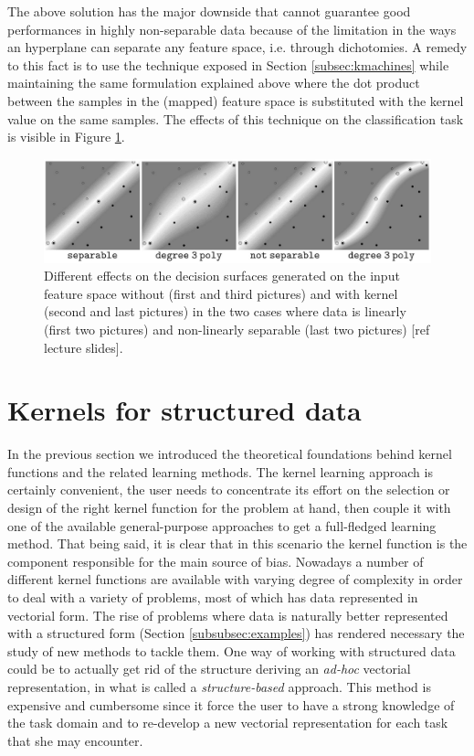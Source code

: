 The above solution has the major downside that cannot guarantee good performances
in highly non-separable data because of the limitation in the ways an hyperplane
can separate any feature space, i.e. through dichotomies.
A remedy to this fact is to use the technique exposed in Section \ref{subsec:kmachines}
while maintaining the same formulation explained above where the dot product between
the samples in the (mapped) feature space is substituted with the kernel value on the
same samples.
The effects of this technique on the classification task is visible in Figure \ref{fig:kernsvm}.

\begin{figure}[ht]
    \centering
    \includegraphics[scale=0.3]{Figures/kernsvm}
    \caption{Different effects on the decision surfaces generated on the input
        feature space without (first and third pictures) and with kernel (second and last pictures)
        in the two cases where data is linearly (first two pictures) and non-linearly separable (last two pictures)
        [ref lecture slides].}
    \label{fig:kernsvm}
\end{figure}


\section{Kernels for structured data}
\label{sec:graphkernels}

In the previous section we introduced the theoretical foundations behind kernel
functions and the related learning methods.
The kernel learning approach is certainly convenient, the user needs to concentrate
its effort on the selection or design of the right kernel function for the problem
at hand, then couple it with one of the available general-purpose approaches to
get a full-fledged learning method.
That being said, it is clear that in this scenario the kernel function is the
component responsible for the main source of bias.
Nowadays a number of different kernel functions are available with varying degree
of complexity in order to deal with a variety of problems, most of which has data
represented in vectorial form.
The rise of problems where data is naturally better represented with a
structured form (Section \ref{subsubsec:examples}) has rendered necessary the
study of new methods to tackle them.
One way of working with structured data could be to actually get rid of the structure
deriving an \emph{ad-hoc} vectorial representation, in what is called a
\emph{structure-based} approach.
This method is expensive and cumbersome since it force the user to have a strong
knowledge of the task domain and to re-develop a new vectorial representation
for each task that she may encounter.

